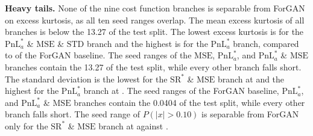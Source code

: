 \textbf{Heavy tails.} None of the nine cost function branches is separable from ForGAN on excess kurtosis, as all ten seed ranges overlap. The mean excess kurtosis of all branches is below the \num{13.27} of the test split. The lowest excess kurtosis is  for the $\mathrm{PnL}^{*}_{a}$ \& $\mathrm{MSE}$ \& $\mathrm{STD}$ branch and the highest is  for the $\mathrm{PnL}^{*}_{a}$ branch, compared to  of the ForGAN baseline. The seed ranges of the $\mathrm{MSE}$, $\mathrm{PnL}^{*}_{a}$, and $\mathrm{PnL}^{*}_{a}$ \& $\mathrm{MSE}$ branches contain the \num{13.27} of the test split, while every other branch falls short. The standard deviation is the lowest for the $\mathrm{SR}^{*}$ \& $\mathrm{MSE}$ branch at  and the highest for the $\mathrm{PnL}^{*}_{a}$ branch at . The seed ranges of the ForGAN baseline, $\mathrm{PnL}^{*}_{a}$, and $\mathrm{PnL}^{*}_{a}$ \& $\mathrm{MSE}$ branches contain the \num{0.0404} of the test split, while every other branch falls short. The seed range of $P(|x|>0.10)$ is separable from ForGAN only for the $\mathrm{SR}^{*}$ \& $\mathrm{MSE}$ branch at  against .

